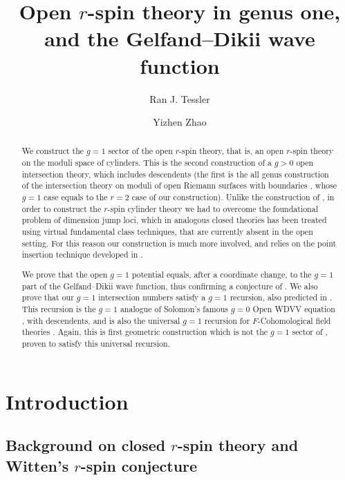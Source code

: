\documentclass[11pt]{amsart}
\title{Open $r$-spin theory in genus one, and the Gelfand--Dikii wave function}
\date{}
\author{Ran J. Tessler \and Yizhen Zhao}
\theoremstyle{definition}
\theoremstyle{remark}
\newcommand{\<}{\left<}
\renewcommand{\>}{\right>}
\numberwithin{equation}{section}
\begin{document}
\maketitle
\begin{abstract}
We construct the $g=1$ sector of the open $r$-spin theory, that is, an open $r$-spin theory on the moduli space of cylinders. This is the second construction of a $g>0$ open intersection theory, which includes descendents (the first is the all genus construction of the intersection theory on moduli of open Riemann surfaces with boundaries \cite{PST14,Tes15}, whose $g=1$ case equals to the $r=2$ case of our construction). Unlike the construction of \cite{Tes15}, in order to construct the $r$-spin cylinder theory we had to overcome the foundational problem of dimension jump loci, which in analogous closed theories has been treated using virtual fundamental class techniques, that are currently absent in the open setting. For this reason our construction is much more involved, and relies on the point insertion technique developed in \cite{TZ1,TZ2}.


We prove that the open $g=1$ potential equals, after a coordinate change, to the $g=1$ part of the Gelfand--Dikii wave function, thus confirming a conjecture of \cite{BCT3}.
We also prove that our $g=1$ intersection numbers satisfy a $g=1$ recursion, also predicted in \cite{BCT3,gomez2021open}. This recursion is the $g=1$ analogue of Solomon's famous $g=0$ Open WDVV equation \cite{sol_owdvv}, with descendents, and is also the universal $g=1$ recursion for $F$-Cohomological field theories \cite{alexandrov2023construction}.
Again, this is first geometric construction which is not the $g=1$ sector of \cite{PST14,Tes15}, proven to satisfy this universal recursion.
\end{abstract}

\maketitle

\setcounter{tocdepth}{1}
\tableofcontents

\section{Introduction}\label{sec intro}
\subsection{Background on closed $r$-spin theory and Witten's $r$-spin conjecture}
\end{document}
